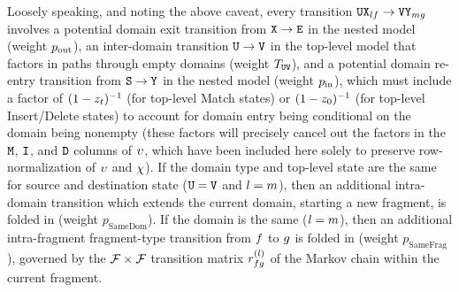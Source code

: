 Loosely speaking, and noting the above caveat, every transition ${\tt U}{\tt X}_{lf}\to{\tt V}{\tt Y}_{mg}$
involves a potential domain exit transition from ${\tt X}\to{\tt E}$ in the nested model (weight $p_\mathrm{out}$),
an inter-domain transition ${\tt U}\to{\tt V}$ in the top-level model that factors in paths through empty domains (weight $T_{{\tt U}{\tt V}}$),
and a potential domain re-entry transition from ${\tt S}\to{\tt Y}$ in the nested model (weight $p_\mathrm{in}$),
which must include a factor of $(1 - z_t)^{-1}$ (for top-level Match states) or $(1 - z_0)^{-1}$ (for top-level Insert/Delete states) to account for domain entry being conditional on the domain being nonempty
(these factors will precisely cancel out the factors in the ${\tt M}$, ${\tt I}$, and ${\tt D}$ columns of $\upsilon$,
which have been included here solely to preserve row-normalization of $\upsilon$ and $\chi$).
If the domain type and top-level state are the same for source and destination state (${\tt U}={\tt V}$ and $l=m$), then an additional intra-domain transition which extends the current domain, starting a new fragment, is folded in (weight $p_\text{SameDom}$).
If the domain is the same ($l=m$), then an additional intra-fragment
fragment-type transition from $f$ to $g$ is folded in (weight $p_\text{SameFrag}$),
governed by the $\mathcal{F} \times \mathcal{F}$ transition matrix $r^{(l)}_{fg}$
of the Markov chain within the current fragment.

